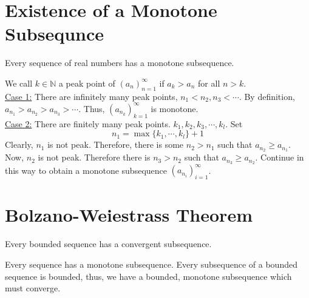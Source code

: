 \documentclass[12pt]{article}
\begin{document}
\section{Existence of a Monotone Subsequnce}
\begin{theo}{}
    Every sequence of real numbers has a monotone subsequence.
\end{theo}
\begin{prf}{}
We call $k \in \mathbb N$ a peak point of $(a_n)_{n=1}^\infty$ if $a_k > a_n$ for all $n > k$. \\
\underline{Case 1:} There are infinitely many peak points, $n_1 < n_2, n_3 < \cdots$. By definition, $a_{n_1} > a_{n_2} > a_{n_3} >  \cdots$. Thus, $(a_{n_k})_{k=1}^\infty$ is monotone.\\
\underline{Case 2:} There are finitely many peak points. $k_1, k_2, k_3, \cdots, k_l$. Set $$n_1 = \max\{k_1, \cdots, k_l\} + 1$$ Clearly, $n_1$ is not peak. Therefore, there is some $n_2 > n_1$ such that $a_{n_2} \ge a_{n_1}$. Now, $n_2$ is not peak. Therefore there is $n_3 > n_2$ such that $a_{n_3} \ge a_{n_2}$. Continue in this way to obtain a monotone subsequence $(a_{n_i})_{i=1}^\infty$.
\end{prf}

\section{Bolzano-Weiestrass Theorem}
\begin{theo}{}
    Every bounded sequence has a convergent subsequence.
\end{theo}
\begin{prf}{}
    Every sequence has a monotone subsequence. Every subsequence of a bounded sequence is bounded, thus, we have a bounded, monotone subsequence which must converge. 
\end{prf}
\newpage
\end{document}
